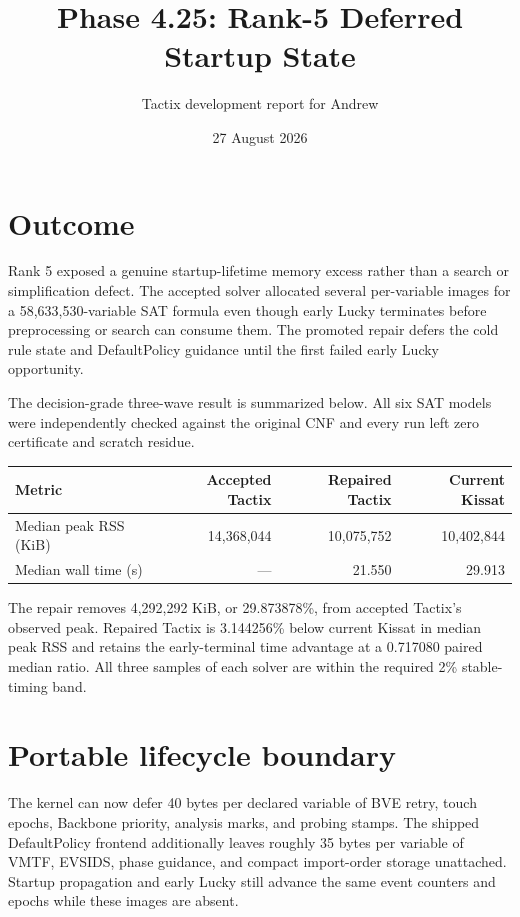 \documentclass[11pt]{article}
\title{Phase 4.25: Rank-5 Deferred Startup State}
\author{Tactix development report for Andrew}
\date{27 August 2026}
\begin{document}
\maketitle

\section{Outcome}

Rank 5 exposed a genuine startup-lifetime memory excess rather than a search
or simplification defect.  The accepted solver allocated several per-variable
images for a 58,633,530-variable SAT formula even though early Lucky terminates
before preprocessing or search can consume them.  The promoted repair defers
the cold rule state and DefaultPolicy guidance until the first failed early
Lucky opportunity.

The decision-grade three-wave result is summarized below.  All six SAT models
were independently checked against the original CNF and every run left zero
certificate and scratch residue.

\begin{center}
\begin{tabular}{lrrr}
\toprule
Metric & Accepted Tactix & Repaired Tactix & Current Kissat \\
\midrule
Median peak RSS (KiB) & 14,368,044 & 10,075,752 & 10,402,844 \\
Median wall time (s)  & ---        & 21.550     & 29.913 \\
\bottomrule
\end{tabular}
\end{center}

The repair removes 4,292,292 KiB, or 29.873878\%, from accepted Tactix's
observed peak.  Repaired Tactix is 3.144256\% below current Kissat in median
peak RSS and retains the early-terminal time advantage at a 0.717080 paired
median ratio.  All three samples of each solver are within the required 2\%
stable-timing band.

\section{Portable lifecycle boundary}

The kernel can now defer 40 bytes per declared variable of BVE retry, touch
epochs, Backbone priority, analysis marks, and probing stamps.  The shipped
DefaultPolicy frontend additionally leaves roughly 35 bytes per variable of
VMTF, EVSIDS, phase guidance, and compact import-order storage unattached.
Startup propagation and early Lucky still advance the same event counters and
epochs while these images are absent.
\end{document}
